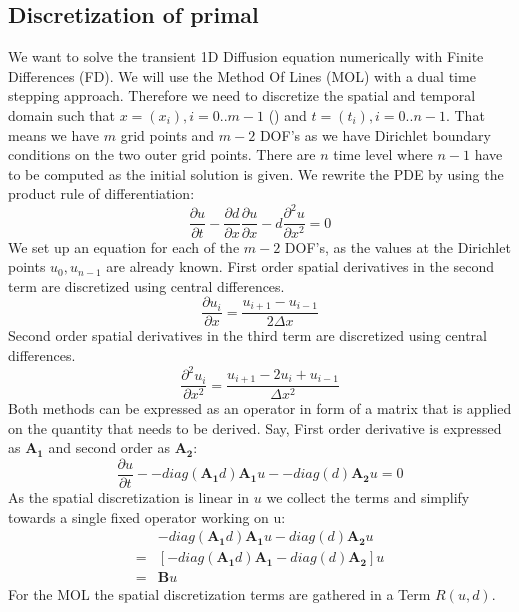 \documentclass[10pt]{article}
\begin{document}
\subsection{Discretization of primal}
We want to solve the transient 1D Diffusion equation numerically with Finite Differences (FD). We will use the Method Of Lines (MOL) with a dual time stepping approach. Therefore we need to discretize the spatial and temporal domain such that $x=(x_i), i=0..m-1$ () and $t=(t_i), i=0 .. n-1$. That means we have $m$ grid points and $m-2$ DOF's as we have Dirichlet boundary conditions on the two outer grid points. There are $n$ time level where $n-1$ have to be computed as the initial solution is given. We rewrite the PDE by using the product rule of differentiation:
\begin{equation}
\frac{\partial u}{\partial t} - \frac{\partial d}{\partial x}\frac{\partial u}{\partial x} -d \frac{\partial^2 u}{\partial x^2}  = 0
\end{equation}
We set up an equation for each of the $m-2$ DOF's, as the values at the Dirichlet points $u_0, u_{n-1}$ are already known. First order spatial derivatives in the second term are discretized using central differences.
\begin{equation}
\frac{\partial u_i}{\partial x} = \frac{u_{i+1} - u_{i-1}}{2\Delta x}
\end{equation}
Second order spatial derivatives in the third term are discretized using central differences.
\begin{equation}
\frac{\partial^2 u_i}{\partial x^2} = \frac{u_{i+1} - 2 u_{i} + u_{i-1}}{\Delta x^2}
\end{equation}
Both methods can be expressed as an operator in form of a matrix that is applied on the quantity that needs to be derived. Say, First order derivative is expressed as $\mathbf{A_1}$ and second order as $\mathbf{A_2}$:
\begin{equation}
\frac{\partial u}{\partial t} - -diag(\mathbf{A_1}d)\mathbf{A_1}u - -diag(d) \mathbf{A_2}u = 0
\end{equation}
As the spatial discretization is linear in $u$ we collect the terms and simplify towards a single fixed operator working on u:
\begin{align}
&-diag(\mathbf{A_1}d)\mathbf{A_1}u - diag(d) \mathbf{A_2}u \\
=&\left[ -diag(\mathbf{A_1}d)\mathbf{A_1} - diag(d) \mathbf{A_2} \right]u \\
=& \mathbf{B}u
\end{align}
For the MOL the spatial discretization terms are gathered in a Term $R(u,d)$.
\end{document}
